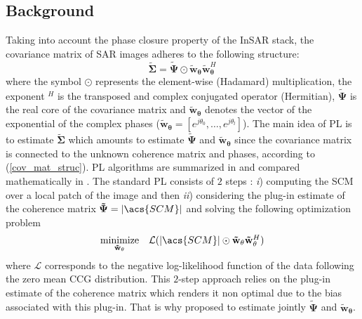 \subsection{Background}
\label{sssec:background}
Taking into account the phase closure property of the InSAR stack, the covariance matrix of SAR images adheres to the following structure: 
\vspace{-7pt} 
\begin{equation}
\label{cov_mat_struc}
   \mathbf{\tilde{\Sigma}} = \mathbf{\tilde{\Psi}} \odot \mathbf{\tilde{w}}_{\mathbf{\theta}}\mathbf{\tilde{w}}_{\mathbf{\theta}}^H
\end{equation}
\vspace{-2pt} 
where the symbol $\odot$ represents the element-wise (Hadamard) multiplication, the exponent $^H$ is the transposed and complex conjugated operator (Hermitian), $\mathbf{\tilde{\Psi}}$ is the real core of the covariance matrix and $\mathbf{\tilde{w}}_{\mathbf{\theta}}$ denotes the vector of the exponential of the complex phases ($\mathbf{\tilde{w}}_{\mathbf{\theta}}=[e^{j \theta_0}, \dots,e^{j \theta_{l}}]$). The main idea of \acs{PL} is to estimate $\mathbf{\tilde{\Sigma}}$ which amounts to estimate $\mathbf{\tilde{\Psi}}$ and $\mathbf{\tilde{w}}_{\mathbf{\theta}}$ since the covariance matrix is connected to the unknown coherence matrix and phases, according to (\ref{cov_mat_struc}). 
\acs{PL} algorithms are summarized in \citep{10261889} and compared mathematically in \citep{cao2015mathematical}.  
The standard \acs{PL} consists of $2$ steps : \textit{i}) computing the \ac{SCM} over a local patch of the image and then \textit{ii}) considering the plug-in estimate of the coherence matrix $\mathbf{\tilde{\Psi}} = |\acs{SCM}|$ and solving the following optimization problem
\begin{gather}
\label{eq:classic_phaselinking}
    \begin{array}{cl}
    \underset{\mathbf{\tilde{w}}_{\mathbf{\theta}}}{\rm minimize}
    & 
    \mathcal{L}(|\acs{SCM}| \odot \mathbf{\tilde{w}}_{\mathbf{\theta}}\mathbf{\tilde{w}}_{\mathbf{\theta}}^H)
    \end{array}
\end{gather}
where $\mathcal{L}$ corresponds to the negative log-likelihood function of the data following the zero mean \ac{CCG} distribution.
This $2$-step approach relies on the plug-in estimate of the coherence matrix which renders it non optimal due to the bias associated with this plug-in. That is why \citep{vu2022new, vu2023robust} proposed to estimate jointly $\mathbf{\tilde{\Psi}}$ and $\mathbf{\tilde{w}}_{\mathbf{\theta}}$. 
